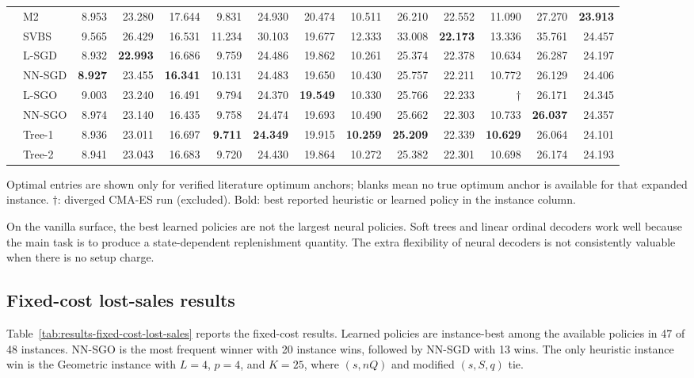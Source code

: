 \documentclass[authoryear,11pt]{elsarticle}
\begin{document}
\begin{table}[!htbp]
{\begin{tabular}{llrrrrrrrrrrrr}
 & M2 & 8.953 & 23.280 & 17.644 & 9.831 & 24.930 & 20.474 & 10.511 & 26.210 & 22.552 & 11.090 & 27.270 & \textbf{23.913} \\
 & SVBS & 9.565 & 26.429 & 16.531 & 11.234 & 30.103 & 19.677 & 12.333 & 33.008 & \textbf{22.173} & 13.336 & 35.761 & 24.457 \\
 & L-SGD & 8.932 & \textbf{22.993} & 16.686 & 9.759 & 24.486 & 19.862 & 10.261 & 25.374 & 22.378 & 10.634 & 26.287 & 24.197 \\
 & NN-SGD & \textbf{8.927} & 23.455 & \textbf{16.341} & 10.131 & 24.483 & 19.650 & 10.430 & 25.757 & 22.211 & 10.772 & 26.129 & 24.406 \\
 & L-SGO & 9.003 & 23.240 & 16.491 & 9.794 & 24.370 & \textbf{19.549} & 10.330 & 25.766 & 22.233 & $\dagger$ & 26.171 & 24.345 \\
 & NN-SGO & 8.974 & 23.140 & 16.435 & 9.758 & 24.474 & 19.693 & 10.490 & 25.662 & 22.303 & 10.733 & \textbf{26.037} & 24.357 \\
 & Tree-1 & 8.936 & 23.011 & 16.697 & \textbf{9.711} & \textbf{24.349} & 19.915 & \textbf{10.259} & \textbf{25.209} & 22.339 & \textbf{10.629} & 26.064 & 24.101 \\
 & Tree-2 & 8.941 & 23.043 & 16.683 & 9.720 & 24.430 & 19.864 & 10.272 & 25.382 & 22.301 & 10.698 & 26.174 & 24.193 \\
\bottomrule
\end{tabular}}
\par\medskip\footnotesize Optimal entries are shown only for verified literature optimum anchors; blanks mean no true optimum anchor is available for that expanded instance. $\dagger$: diverged CMA-ES run (excluded). Bold: best reported heuristic or learned policy in the instance column.
\end{table}
\FloatBarrier


On the vanilla surface, the best learned policies are not the largest neural policies. Soft trees and linear ordinal decoders work well because the main task is to produce a state-dependent replenishment quantity. The extra flexibility of neural decoders is not consistently valuable when there is no setup charge.

\subsection{Fixed-cost lost-sales results}

Table~\ref{tab:results-fixed-cost-lost-sales} reports the fixed-cost results. Learned policies are instance-best among the available policies in 47 of 48 instances. NN-SGO is the most frequent winner with 20 instance wins, followed by NN-SGD with 13 wins. The only heuristic instance win is the Geometric instance with $L=4$, $p=4$, and $K=25$, where $(s,nQ)$ and modified $(s,S,q)$ tie.
\end{document}

